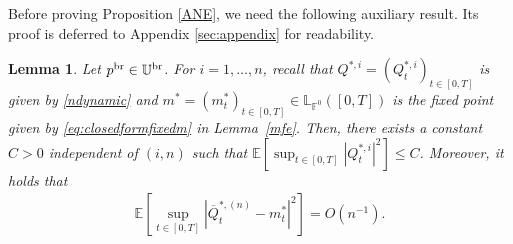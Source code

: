 \documentclass[11pt]{article}
\newtheorem{lemma}{Lemma}[section]
\numberwithin{equation}{section}
\begin{document}
Before proving Proposition \ref{ANE}, we need the following auxiliary result. Its proof is deferred to Appendix \ref{sec:appendix} for readability.

\begin{lemma}\label{lemma3.1}
Let $ p^{{\rm br}}\in\mathbb{U}^{\rm br}$. For $i=1,\ldots,n$, recall that $Q^{*,i}=(Q_t^{*,i})_{t\in[0,T]}$ is given by \eqref{ndynamic} and $m^*=(m_t^*)_{t\in[0,T]}\in\mathbb{L}_{\mathbb{F}^0}([0,T])$ is the fixed point given by \eqref{eq:closedformfixedm} in Lemma~\ref{mfe}. Then, there exists a constant $C>0$ independent of $(i,n)$ such that $\mathbb{E}[\sup_{t\in [0,T]}|Q_t^{*,i}|^2]\leq C$. Moreover, it holds that  
 \begin{align*}
\mathbb{E}\left[\sup_{t\in [0,T]}\left|\overline{Q}_t^{*,(n)}-m_t^*\right|^2\right]=O\left(n^{-1}\right).
\end{align*}
\end{lemma}
    
\end{document}

